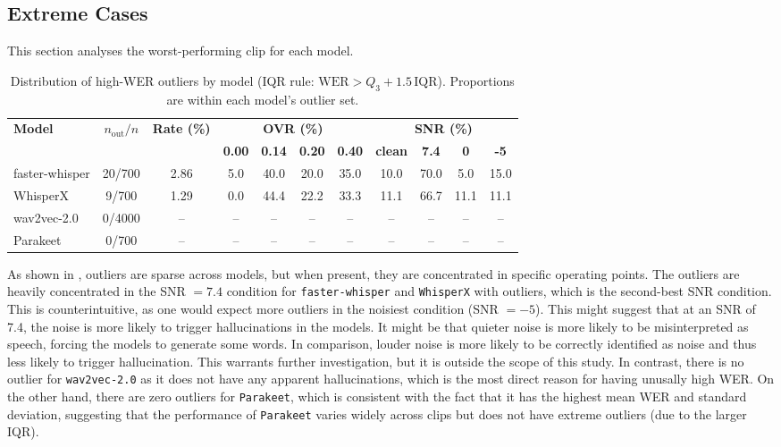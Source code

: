 \subsection{Extreme Cases}
This section analyses the worst-performing clip for each model. 

\begin{table}[htbp]
\centering
\caption{Distribution of high-WER outliers by model (IQR rule: $\mathrm{WER}>Q_3+1.5\,\mathrm{IQR}$). Proportions are within each model's outlier set.}
\label{tab:outlier_condition_distribution}
\small
\setlength{\tabcolsep}{3pt}
\begin{tabular}{lcccccccccc}
\toprule
\textbf{Model} & \textbf{$n_{\text{out}}/n$} & \textbf{Rate (\%)} & \multicolumn{4}{c}{\textbf{OVR (\%)}} & \multicolumn{4}{c}{\textbf{SNR (\%)}} \\
\cmidrule(lr){4-7}\cmidrule(lr){8-11}
 &  &  & \textbf{0.00} & \textbf{0.14} & \textbf{0.20} & \textbf{0.40} & \textbf{clean} & \textbf{7.4} & \textbf{0} & \textbf{-5} \\
\midrule
faster-whisper & 20/700 & 2.86 & 5.0 & 40.0 & 20.0 & 35.0 & 10.0 & 70.0 & 5.0 & 15.0 \\
WhisperX & 9/700 & 1.29 & 0.0 & 44.4 & 22.2 & 33.3 & 11.1 & 66.7 & 11.1 & 11.1 \\
wav2vec-2.0 & 0/4000 & -- & -- & -- & -- & -- & -- & -- & -- & -- \\
Parakeet & 0/700 & -- & -- & -- & -- & -- & -- & -- & -- & -- \\
\bottomrule
\end{tabular}
\setlength{\tabcolsep}{6pt}
\normalsize
\end{table}

As shown in , outliers are sparse across models, but when present, they are concentrated in specific operating points. The outliers are heavily concentrated in the SNR $=7.4$ condition for \texttt{faster-whisper} and \texttt{WhisperX} with outliers, which is the second-best SNR condition. This is counterintuitive, as one would expect more outliers in the noisiest condition (SNR $=-5$). This might suggest that at an SNR of 7.4, the noise is more likely to trigger hallucinations in the models. It might be that quieter noise is more likely to be misinterpreted as speech, forcing the models to generate some words. In comparison, louder noise is more likely to be correctly identified as noise and thus less likely to trigger hallucination. This warrants further investigation, but it is outside the scope of this study. In contrast, there is no outlier for \texttt{wav2vec-2.0} as it does not have any apparent hallucinations, which is the most direct reason for having unusally high WER. On the other hand, there are zero outliers for \texttt{Parakeet}, which is consistent with the fact that it has the highest mean WER and standard deviation, suggesting that the performance of \texttt{Parakeet} varies widely across clips but does not have extreme outliers (due to the larger IQR).

